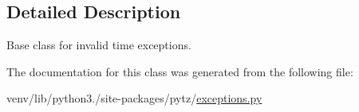 \subsection{Detailed Description}
\begin{DoxyVerb}Base class for invalid time exceptions.\end{DoxyVerb}
 

The documentation for this class was generated from the following file\+:\begin{DoxyCompactItemize}
\item 
venv/lib/python3./site-\/packages/pytz/\hyperlink{pytz_2exceptions_8py}{exceptions.\+py}\end{DoxyCompactItemize}
